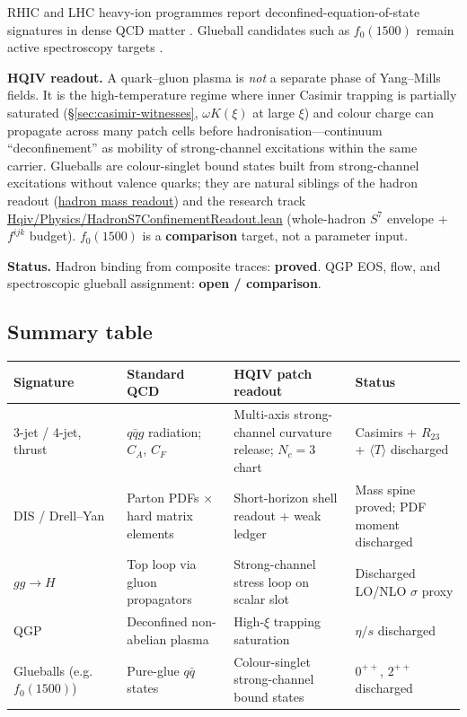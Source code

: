 \documentclass[11pt]{amsart}
\newcommand{\leanrepo}{https://github.com/HQIV/hqiv-lean/blob/main}
\newcommand{\leanfile}[1]{\href{\leanrepo/#1}{\footnotesize\url{#1}}}
\begin{document}
RHIC and LHC heavy-ion programmes report deconfined-equation-of-state signatures in
dense QCD matter \cite{adams2005,pdg2024}. Glueball candidates such as $f_0(1500)$ remain
active spectroscopy targets \cite{close2014,pdg2024}.

\textbf{HQIV readout.} A quark--gluon plasma is \emph{not} a separate phase of
Yang--Mills fields. It is the high-temperature regime where inner Casimir trapping is
partially saturated (\S\ref{sec:casimir-witnesses}, $\omega K(\xi)$ at large $\xi$) and
colour charge can propagate across many patch cells before hadronisation---continuum
``deconfinement'' as mobility of strong-channel excitations within the same carrier.
Glueballs are colour-singlet bound states built from strong-channel excitations without
valence quarks; they are natural siblings of the hadron readout
(\hyperref[lean:hadron-readout]{hadron mass readout}) and the research track
\leanfile{Hqiv/Physics/HadronS7ConfinementReadout.lean} (whole-hadron $S^7$ envelope +
$f^{ijk}$ budget). $f_0(1500)$ is a \textbf{comparison} target, not a parameter input.

\textbf{Status.} Hadron binding from composite traces: \textbf{proved}. QGP EOS,
flow, and spectroscopic glueball assignment: \textbf{open / comparison}.

\subsection{Summary table}
\label{subsec:qcd-table}

\begin{center}
\small
\begin{tabular}{@{}p{}p{}p{}p{}@{}}
\toprule
Signature & Standard QCD & HQIV patch readout & Status \\
\midrule
3-jet / 4-jet, thrust &
$q\bar qg$ radiation; $C_A$, $C_F$ &
Multi-axis strong-channel curvature release; $N_c=3$ chart &
Casimirs + $R_{23}$ + $\langle T\rangle$ discharged \\
DIS / Drell--Yan &
Parton PDFs $\times$ hard matrix elements &
Short-horizon shell readout + weak ledger &
Mass spine proved; PDF moment discharged \\
$gg\to H$ &
Top loop via gluon propagators &
Strong-channel stress loop on scalar slot &
Discharged LO/NLO $\sigma$ proxy \\
QGP &
Deconfined non-abelian plasma &
High-$\xi$ trapping saturation &
$\eta/s$ discharged \\
Glueballs (e.g.\ $f_0(1500)$) &
Pure-glue $q\bar q$ states &
Colour-singlet strong-channel bound states &
$0^{++}$, $2^{++}$ discharged \\
\bottomrule
\end{tabular}
\end{center}
\end{document}
